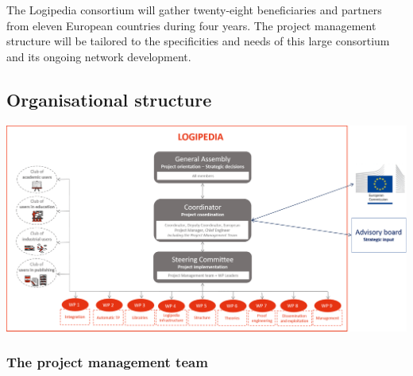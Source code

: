 The Logipedia consortium will gather twenty-eight beneficiaries and partners
from eleven European countries during four years. The project management
structure will be tailored to the specificities and needs of this
large consortium and its ongoing network development.

\subsection*{Organisational structure}

\includegraphics[width=\textwidth]{img/Gouvernance-reduced}

\subsubsection*{The project management team}

